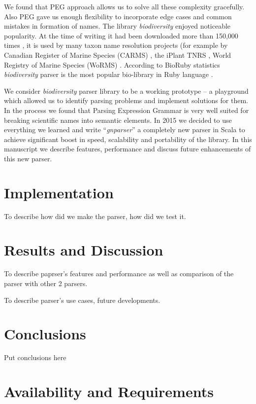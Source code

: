 \documentclass{bmcart}
\begin{document}
We found that PEG approach allows us to solve all these complexity gracefully.
Also PEG gave us enough flexibility to incorporate edge cases and common
mistakes in formation of names. The library \textit{biodiversity} enjoyed
noticeable popularity. At the time of writing it had been downloaded more than
150,000 times \cite{bdiv_downloads}, it is used by many taxon name resolution
projects (for example by Canadian Register of Marine Species (CARMS)
\cite{carms}, the iPlant TNRS \cite{iplant}, World Registry of Marine Species
(WoRMS) \cite{worms}.  According to BioRuby statistics \textit{biodiversity}
parser is the most popular bio-library in Ruby language \cite{biogems}.

We consider \textit{biodiversity} parser library to be a working prototype -- a
playground which allowed us to identify parsing problems and implement
solutions for them. In the process we found that Parsing Expression Grammar is
very well suited for breaking scientific names into semantic elements. In 2015
we decided to use everything we learned and write ``\textit{gnparser}'' a
completely new parser in Scala to achieve significant boost in speed,
scalability and portability of the library. In this manuscript we describe
features, performance and discuss future enhancements of this new parser.

\section*{Implementation}

To describe how did we make the parser, how did we test it.

\section*{Results and Discussion}

To describe paprser's features and performance as well as comparison of the
parser with other 2 parsers.

To describe parser's use cases, future developments.

\section*{Conclusions}

Put conclusions here

\section*{Availability and Requirements}
\end{document}

